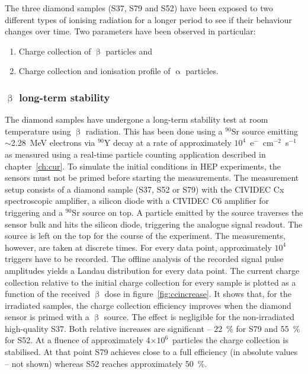 The three diamond samples (S37, S79 and S52) have been exposed to two different types of ionising radiation for a longer period to see if their behaviour changes over time. Two parameters have been observed in particular: 
\begin{enumerate}
\item Charge collection of $\upbeta$ particles and 
\item Charge collection and ionisation profile of $\upalpha$ particles.
\end{enumerate}

\subsubsection{$\upbeta$ long-term stability}
The diamond samples have undergone a long-term stability test at room temperature using $\upbeta$ radiation. This has been done using a $^{90}$Sr source emitting $\sim$2.28~MeV electrons via $^{90}$Y decay at a rate of approximately $10^4$~e$^-$~cm$^{-2}$~s$^{-1}$ as measured using a real-time particle counting application described in chapter~\ref{ch:cur}. To simulate the initial conditions in HEP experiments, the sensors must not be primed before starting the measurements. The measurement setup consists of a diamond sample (S37, S52 or S79) with the CIVIDEC Cx spectroscopic amplifier, a silicon diode with a CIVIDEC C6 amplifier for triggering and a $^{90}$Sr source on top. A particle emitted by the source traverses the sensor bulk and hits the silicon diode, triggering the analogue signal readout. The source is left on the top for the course of the experiment. The measurements, however, are taken at discrete times. For every data point, approximately $10^4$ triggers have to be recorded. The offline analysis of the recorded signal pulse amplitudes yields a Landau distribution for every data point. The current charge collection relative to the initial charge collection for every sample is plotted as a function of the received $\upbeta$ dose in figure~\ref{fig:ccincrease}. It shows that, for the irradiated samples, the charge collection efficiency improves when the diamond sensor is primed with a $\upbeta$ source. The effect is negligible for the non-irradiated high-quality S37. Both relative increases are significant -- 22~\% for S79 and 55~\% for S52. At a fluence of approximately 4$\times10^6$~particles the charge collection is stabilised. At that point S79 achieves close to a full efficiency (in absolute values -- not shown) whereas S52 reaches approximately 50~\%.

